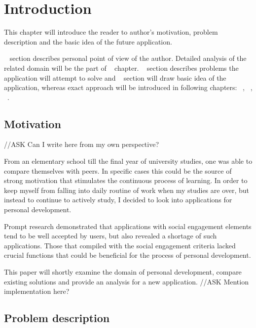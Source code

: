 

\chapter{Introduction}\label{ch:introduction}

This chapter will introduce the reader to author's motivation, problem description and the basic idea of the future application.

~ section describes personal point of view of the author.
Detailed analysis of the related domain will be the part of ~ chapter.
~ section describes problems the application will attempt to solve and
~ section will draw basic idea of the application, whereas exact approach
will be introduced in following chapters: ~, ~, ~.


\section{Motivation}\label{sec:introduction-motivation}

{\color{gray}//ASK Can I write here from my own perspective?}

From an elementary school till the final year of university studies, one was able to compare themselves with peers.
In specific cases this could be the source of strong motivation that stimulates the continuous process of learning.
In order to keep myself from falling into daily routine of work when my studies are over,
but instead to continue to actively study, I decided to look into applications for personal development.

Prompt research demonstrated that applications with social engagement elements tend to be well accepted by users,
but also revealed a shortage of such applications.
Those that compiled with the social engagement criteria lacked crucial functions
that could be beneficial for the process of personal development.

This paper will shortly examine the domain of personal development, compare existing solutions and provide an analysis for a
new application.
{\color{gray}//ASK Mention implementation here?}


\section{Problem description}\label{sec:problem-description}

